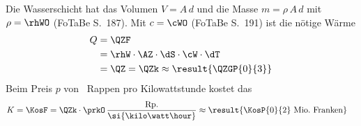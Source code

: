 Die Wasserschicht hat das Volumen $V = A\,d$ und die Masse $m = \rho\,A\,d$ mit $\rho = \rhWO$ (FoTaBe S.~187). Mit $c = \cWO$ (FoTaBe S.~191) ist die nötige Wärme
\begin{align}
 Q &= \QZF \\
   &= \rhW\cdot\AZ\cdot\dS\cdot\cW\cdot\dT \\
   &= \QZ = \QZk \approx \result{\QZGP{0}{3}}
\end{align}
Beim Preis $p$ von \prkO\ Rappen pro Kilowattstunde kostet das
\begin{align}
 K &= \KosF = \QZk\cdot\prkO\,\frac{\text{Rp.}}{\si{\kilo\watt\hour}} \approx \result{\KosP{0}{2}\ \text{Mio.\ Franken}}
\end{align}
